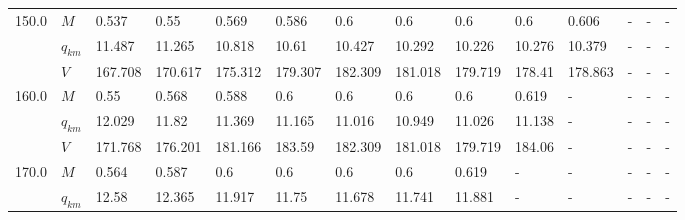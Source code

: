 \begin{tabular}{|l|l|llllllllllll|}
\hline
150.0 & $M$ &    0.537 &     0.55 &                     0.569 &                    0.586 &                       0.6 &                       0.6 &      0.6\cellcolor{green} &      0.6 &                     0.606 &                         - &                         - &        - \\
      & $q_{km}$ &   11.487 &   11.265 &                    10.818 &                    10.61 &                    10.427 &                    10.292 &   10.226\cellcolor{green} &   10.276 &                    10.379 &                         - &                         - &        - \\
      & $V$ &  167.708 &  170.617 &                   175.312 &                  179.307 &                   182.309 &                   181.018 &  179.719\cellcolor{green} &   178.41 &                   178.863 &                         - &                         - &        - \\
\hline
160.0 & $M$ &     0.55 &    0.568 &                     0.588 &                      0.6 &                       0.6 &      0.6\cellcolor{green} &                       0.6 &    0.619 &                         - &                         - &                         - &        - \\
      & $q_{km}$ &   12.029 &    11.82 &                    11.369 &                   11.165 &                    11.016 &   10.949\cellcolor{green} &                    11.026 &   11.138 &                         - &                         - &                         - &        - \\
      & $V$ &  171.768 &  176.201 &                   181.166 &                   183.59 &                   182.309 &  181.018\cellcolor{green} &                   179.719 &   184.06 &                         - &                         - &                         - &        - \\
\hline
170.0 & $M$ &    0.564 &    0.587 &                       0.6 &                      0.6 &      0.6\cellcolor{green} &                       0.6 &                     0.619 &        - &                         - &                         - &                         - &        - \\
      & $q_{km}$ &    12.58 &   12.365 &                    11.917 &                    11.75 &   11.678\cellcolor{green} &                    11.741 &                    11.881 &        - &                         - &                         - &                         - &        - \\

\end{tabular}
